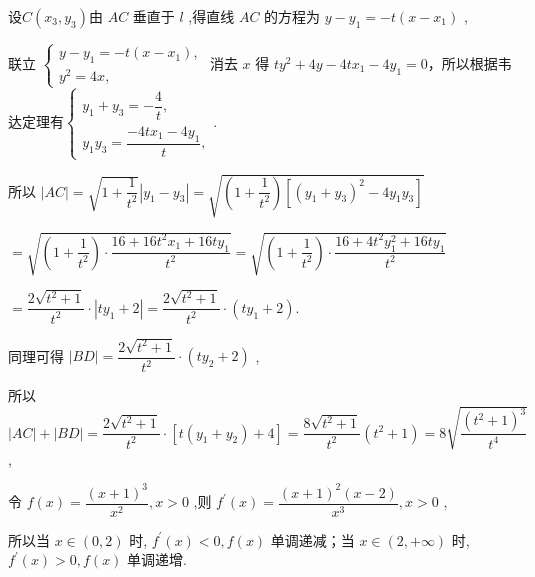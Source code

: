 \begin{enumerate}
\begin{enumerate}
\begin{jieda}
\begin{enumerate}
                设$C\left( {{x}_{3},{y}_{3}}\right)$由 ${AC}$ 垂直于 $l$ ,得直线 ${AC}$ 的方程为 $y - {y}_{1} =  - t\left( {x - {x}_{1}}\right)$ ,
                
                联立 $\left\{  \begin{array}{l} y - {y}_{1} =  - t\left( {x - {x}_{1}}\right) , \\  {y}^{2} = {4x}, \end{array}\right.$ 消去 $x$ 得 $t{y}^{2} + {4y} - {4t}{x}_{1} - 4{y}_{1} = 0$，所以根据韦达定理有$\left\{  \begin{array}{l} {y}_{1} + {y}_{3} =  - \dfrac{4}{t}, \\  {y}_{1}{y}_{3} = \dfrac{-{4t}{x}_{1} - 4{y}_{1}}{t}, \end{array}\right.$.
                
                所以 $\left| {AC}\right|  = \sqrt{1+\dfrac{1}{t^2}}|y_1-y_3| = \sqrt{\left( {1 + \dfrac{1}{{t}^{2}}}\right) \left\lbrack  {{\left( {y}_{1} + {y}_{3}\right) }^{2} - 4{y}_{1}{y}_{3}}\right\rbrack  }$
                
                $= \sqrt{\left( {1 + \dfrac{1}{{t}^{2}}}\right)  \cdot  \dfrac{{16} + {16}{t}^{2}{x}_{1} + {16t}{y}_{1}}{{t}^{2}}} = \sqrt{\left( {1 + \dfrac{1}{{t}^{2}}}\right)  \cdot  \dfrac{{16} + 4{t}^{2}{y}_{1}^{2} + {16t}{y}_{1}}{{t}^{2}}}$
                
                $= \dfrac{2\sqrt{{t}^{2} + 1}}{{t}^{2}} \cdot  \left| {t{y}_{1} + 2}\right| = \dfrac{2\sqrt{{t}^{2} + 1}}{{t}^{2}} \cdot  \left( {t{y}_{1} + 2}\right) .$
                
                同理可得 $\left| {BD}\right|  = \dfrac{2\sqrt{{t}^{2} + 1}}{{t}^{2}} \cdot  \left( {t{y}_{2} + 2}\right)$ ,
                
                所以 $\left| {AC}\right|  + \left| {BD}\right|  = \dfrac{2\sqrt{{t}^{2} + 1}}{{t}^{2}} \cdot  \left\lbrack  {t\left( {{y}_{1} + {y}_{2}}\right)  + 4}\right\rbrack   = \dfrac{8\sqrt{{t}^{2} + 1}}{{t}^{2}}\left( {{t}^{2} + 1}\right)  = 8\sqrt{\dfrac{{\left( {t}^{2} + 1\right) }^{3}}{{t}^{4}}}$ ,
                
                令 $f\left( x\right)  = \dfrac{{\left( x + 1\right) }^{3}}{{x}^{2}},x > 0$ ,则 ${f}^{\prime }\left( x\right)  = \dfrac{{\left( x + 1\right) }^{2}\left( {x - 2}\right) }{{x}^{3}},x > 0$ ,
                
                所以当 $x \in  \left( {0,2}\right)$ 时, ${f}^{\prime }\left( x\right)  < 0,f\left( x\right)$ 单调递减；当 $x \in  \left( {2, + \infty }\right)$ 时, ${f}^{\prime }\left( x\right)  > 0,f\left( x\right)$ 单调递增.
                

\end{enumerate}
\end{jieda}
\end{enumerate}
\end{enumerate}
